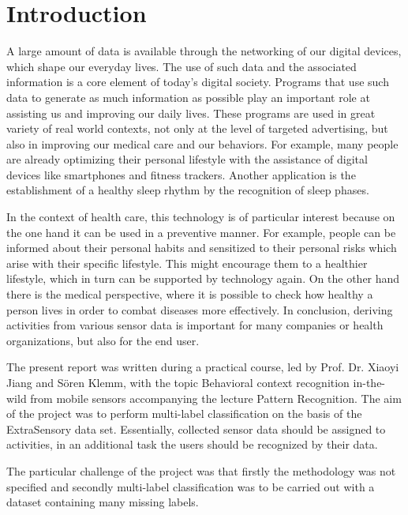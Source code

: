 \section{Introduction}
A large amount of data is available through the networking of our digital devices, which shape our everyday lives. The use of such data and the associated information is a core element of today's digital society. Programs that use such data to generate as much information as possible play an important role at assisting us and improving our daily lives. These programs are used in great variety of real world contexts, not only at the level of targeted advertising, but also in improving our medical care and our behaviors. For example, many people are already optimizing their personal lifestyle with the assistance of digital devices like smartphones and fitness trackers. Another application is the establishment of a healthy sleep rhythm by the recognition of sleep phases. 

In the context of health care, this technology is of particular interest because on the one hand it can be used in a preventive manner. For example, people can be informed about their personal habits and sensitized to their personal risks which arise with their specific lifestyle. This might encourage them to a healthier lifestyle, which in turn can be supported by technology again. On the other hand there is the medical perspective, where it is possible to check how healthy a person lives in order to combat diseases more effectively. In conclusion, deriving activities from various sensor data is important for many companies or health organizations, but also for the end user.

The present report was written during a practical course, led by Prof. Dr. Xiaoyi Jiang and Sören Klemm, with the topic \gl Behavioral context recognition in-the-wild from mobile sensors\gr{} accompanying the lecture Pattern Recognition. The aim of the project was to perform multi-label classification on the basis of the ExtraSensory data set. Essentially, collected sensor data should be assigned to activities, in an additional task the users should be recognized by their data. 

The particular challenge of the project was that firstly the methodology was not specified and secondly multi-label classification was to be carried out with a dataset containing many missing labels. 